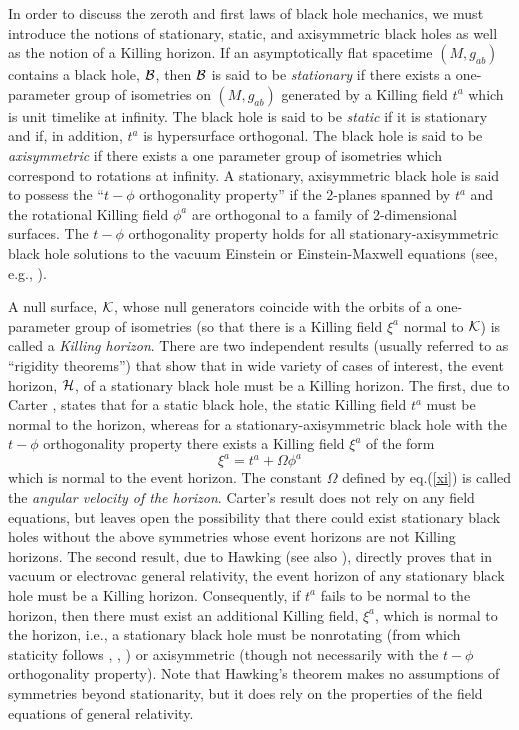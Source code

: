 \documentclass[12pt]{article}
\begin{document}
In order to discuss the zeroth and first laws of black hole mechanics,
we must introduce the notions of stationary, static, and axisymmetric
black holes as well as the notion of a Killing horizon. If an
asymptotically flat spacetime $(M, g_{ab})$ contains a black hole,
${\cal B}$, then ${\cal B}$ is said to be {\em stationary} if there
exists a one-parameter group of isometries on $(M, g_{ab})$ generated
by a Killing field $t^a$ which is unit timelike at infinity. The black
hole is said to be {\em static} if it is stationary and if, in
addition, $t^a$ is hypersurface orthogonal. The black hole is said to
be {\em axisymmetric} if there exists a one parameter group of
isometries which correspond to rotations at infinity. A stationary,
axisymmetric black hole is said to possess the ``$t - \phi$
orthogonality property'' if the 2-planes spanned by $t^a$ and the
rotational Killing field $\phi^a$ are orthogonal to a family of
2-dimensional surfaces. The $t - \phi$ orthogonality property holds
for all stationary-axisymmetric black hole solutions to the vacuum
Einstein or Einstein-Maxwell equations (see, e.g., \cite{heu}).

A null surface, ${\cal K}$, whose null generators coincide with the
orbits of a one-parameter group of isometries (so that there is a
Killing field $\xi^a$ normal to ${\cal K}$) is called a {\em Killing
horizon}. There are two independent results (usually referred to as
``rigidity theorems'') that show that in wide variety of cases of
interest, the event horizon, ${\cal H}$, of a stationary black hole
must be a Killing horizon. The first, due to Carter \cite{c}, states
that for a static black hole, the static Killing field $t^a$ must be
normal to the horizon, whereas for a stationary-axisymmetric black
hole with the $t - \phi$ orthogonality property there exists a Killing
field $\xi^a$ of the form
\begin{equation}
\xi^a = t^a + \Omega \phi^a
\label{xi}
\end{equation}
which is normal to the event horizon. The constant $\Omega$ defined by
eq.(\ref{xi}) is called the {\em angular velocity of the horizon}.
Carter's result does not rely on any field equations, but leaves open
the possibility that there could exist stationary black holes without
the above symmetries whose event horizons are not Killing
horizons. The second result, due to Hawking \cite{he} (see also
\cite{frw}), directly proves that in vacuum or electrovac general
relativity, the event horizon of any stationary black hole must be a
Killing horizon. Consequently, if $t^a$ fails to be normal
to the horizon, then there must exist an additional Killing field,
$\xi^a$, which is normal to the horizon, i.e., a stationary black hole
must be nonrotating (from which staticity follows \cite{sw1}, \cite{sw2},
\cite{cw}) or axisymmetric (though not necessarily with the $t - \phi$
orthogonality property). Note that Hawking's theorem makes no
assumptions of symmetries beyond stationarity, but it does rely on the
properties of the field equations of general relativity.
\end{document}
